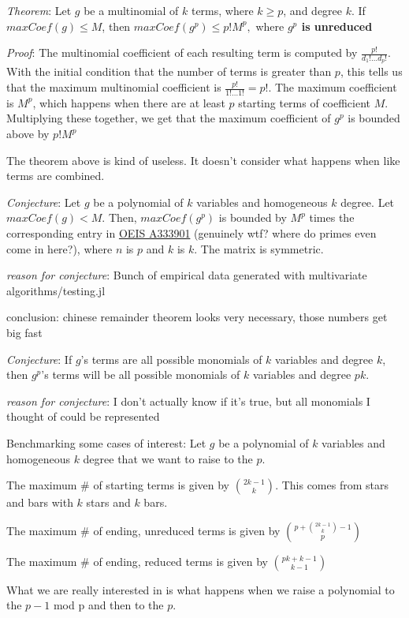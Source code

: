 \documentclass{article}
\begin{document}
\textit{Theorem}: Let $g$ be a multinomial of $k$ terms, where $k \ge p$, and degree $k$. If $maxCoef(g) \le M$, then $maxCoef(g^p) \le p! M^p,$ where \textbf{$g^p$ is unreduced}

\textit{Proof}: The multinomial coefficient of each resulting term is computed by $\frac{p!}{d_{1}!...d_{p}!}$. With the initial condition that the number of terms is greater than $p$, this tells us that the maximum multinomial coefficient is $\frac{p!}{1!...1!} = p!$. The maximum coefficient is $M^p$, which happens when there are at least $p$ starting terms of coefficient $M$. Multiplying these together, we get that the maximum coefficient of $g^p$ is bounded above by $p! M^p$

The theorem above is kind of useless. It doesn't consider what happens when like terms are combined.

\textit{Conjecture}: Let $g$ be a polynomial of $k$ variables and homogeneous $k$ degree. Let $maxCoef(g) < M$. Then, $maxCoef(g^p)$ is bounded by $M^p$ times the corresponding entry in \href{https://oeis.org/A333901/internal}{OEIS A333901} (genuinely wtf? where do primes even come in here?), where $n$ is $p$ and $k$ is $k$. The matrix is symmetric.

\textit{reason for conjecture}: Bunch of empirical data generated with multivariate algorithms/testing.jl

conclusion: chinese remainder theorem looks very necessary, those numbers get big fast

\textit{Conjecture}: If $g$'s terms are all possible monomials of $k$ variables and degree $k$, then $g^p$'s terms will be all possible monomials of $k$ variables and degree $pk$.

\textit{reason for conjecture}: I don't actually know if it's true, but all monomials I thought of could be represented

Benchmarking some cases of interest:
Let $g$ be a polynomial of $k$ variables and homogeneous $k$ degree that we want to raise to the $p$.

The maximum \# of starting terms is given by $\binom{2k-1}{k}$. This comes from stars and bars with $k$ stars and $k$ bars.

The maximum \# of ending, unreduced terms is given by $\binom{p + \binom{2k-1}{k} - 1}{p}$

The maximum \# of ending, reduced terms is given by $\binom{pk + k - 1}{k - 1}$

What we are really interested in is what happens when we raise a polynomial to the $p-1$ mod p and then to the $p$.
\end{document}

